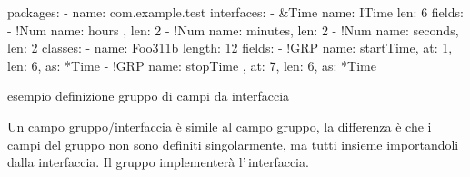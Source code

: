 \documentclass[a4paper,10pt]{report}
\newif\ifesource
\newenvironment{elisting}[1][H]
  {\captionsetup{aboveskip=0pt}\begin{listing}[#1]}
  {\end{listing}%
}
\begin{document}
\ifesource
\begin{figure*}[!htb]
\begin{lstlisting}[language=yaml, 
caption={esempio definizione gruppo di campi da interfaccia}, 
label=lst:xmplIGrp]
packages:
  - name: com.example.test
    interfaces:
      - &Time
        name: ITime
        len: 6
        fields:
          - !Num { name: hours  , len: 2 }
          - !Num { name: minutes, len: 2 }
          - !Num { name: seconds, len: 2 }
    classes:
      - name: Foo311b
        length: 12
        fields:
          - !GRP { name: startTime, at: 1, len: 6, as: *Time }
          - !GRP { name: stopTime , at: 7, len: 6, as: *Time }
\end{lstlisting}
\end{figure*}
\else
\begin{elisting}[!htb]
\begin{yamlcode}
packages:
  - name: com.example.test
    interfaces:
      - &Time
        name: ITime
        len: 6
        fields:
          - !Num { name: hours  , len: 2 }
          - !Num { name: minutes, len: 2 }
          - !Num { name: seconds, len: 2 }
    classes:
      - name: Foo311b
        length: 12
        fields:
          - !GRP { name: startTime, at: 1, len: 6, as: *Time }
          - !GRP { name: stopTime , at: 7, len: 6, as: *Time }
\end{yamlcode}
\caption{esempio definizione gruppo di campi da interfaccia}
\label{lst:xmplIGrp}
\end{elisting}
\fi
Un campo gruppo/interfaccia è simile al campo gruppo, la differenza è che i
campi del gruppo non sono definiti singolarmente, ma tutti insieme importandoli
dalla interfaccia. Il gruppo implementerà l'\,interfaccia.
\end{document}
